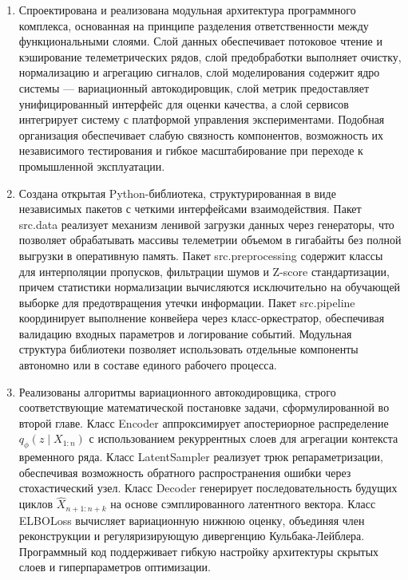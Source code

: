 \documentclass[14pt, a4paper, oneside]{extreport}
\begin{document}
\begin{enumerate}
\item Спроектирована и реализована модульная архитектура программного комплекса, основанная на принципе разделения ответственности между функциональными слоями. Слой данных обеспечивает потоковое чтение и кэширование телеметрических рядов, слой предобработки выполняет очистку, нормализацию и агрегацию сигналов, слой моделирования содержит ядро системы — вариационный автокодировщик, слой метрик предоставляет унифицированный интерфейс для оценки качества, а слой сервисов интегрирует систему с платформой управления экспериментами. Подобная организация обеспечивает слабую связность компонентов, возможность их независимого тестирования и гибкое масштабирование при переходе к промышленной эксплуатации.

\item Создана открытая Python-библиотека, структурированная в виде независимых пакетов с четкими интерфейсами взаимодействия. Пакет {src.data} реализует механизм ленивой загрузки данных через генераторы, что позволяет обрабатывать массивы телеметрии объемом в гигабайты без полной выгрузки в оперативную память. Пакет {src.preprocessing} содержит классы для интерполяции пропусков, фильтрации шумов и Z-score стандартизации, причем статистики нормализации вычисляются исключительно на обучающей выборке для предотвращения утечки информации. Пакет {src.pipeline} координирует выполнение конвейера через класс-оркестратор, обеспечивая валидацию входных параметров и логирование событий. Модульная структура библиотеки позволяет использовать отдельные компоненты автономно или в составе единого рабочего процесса.

\item Реализованы алгоритмы вариационного автокодировщика, строго соответствующие математической постановке задачи, сформулированной во второй главе. Класс {Encoder} аппроксимирует апостериорное распределение $q_\phi(z \mid X_{1:n})$ с использованием рекуррентных слоев для агрегации контекста временного ряда. Класс {LatentSampler} реализует трюк репараметризации, обеспечивая возможность обратного распространения ошибки через стохастический узел. Класс {Decoder} генерирует последовательность будущих циклов $\hat{X}_{n+1:n+k}$ на основе сэмплированного латентного вектора. Класс {ELBOLoss} вычисляет вариационную нижнюю оценку, объединяя член реконструкции и регуляризирующую дивергенцию Кульбака-Лейблера. Программный код поддерживает гибкую настройку архитектуры скрытых слоев и гиперпараметров оптимизации.


\end{enumerate}
\end{document}
